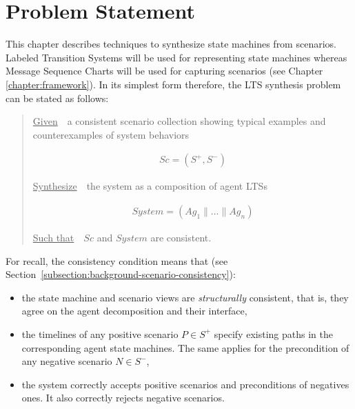 \section{Problem Statement\label{section:inductive-problem-statement}}

This chapter describes techniques to synthesize state machines from scenarios. Labeled Transition Systems will be used for representing state machines whereas Message Sequence Charts will be used for capturing scenarios (see Chapter \ref{chapter:framework}). In its simplest form therefore, the LTS synthesis problem can be stated as follows:

\begin{quotation}
\noindent \underline{Given}~~a consistent scenario collection showing typical examples and counterexamples of system behaviors

\vspace{-0.7cm}
\begin{align*}
Sc = (S^+,S^-)
\end{align*}

\vspace{-0.2cm}
\noindent \underline{Synthesize}~~the system as a composition of agent LTSs

\vspace{-0.7cm}
\begin{align*}
System = (Ag_1 \parallel \ldots \parallel Ag_n)
\end{align*}

\vspace{-0.2cm}
\noindent \underline{Such that}~~$Sc$ and $System$ are consistent.
\end{quotation}

\noindent For recall, the consistency condition means that (see Section~\ref{subsection:background-scenario-consistency}):

\begin{itemize}
\item the state machine and scenario views are \emph{structurally} consistent, that is, they agree on the agent decomposition and their interface,
\item the timelines of any positive scenario $P \in S^+$ specify existing paths in the corresponding agent state machines. The same applies for the precondition of any negative scenario $N \in S^-$,
\item the system correctly accepts positive scenarios and preconditions of negatives ones. It also correctly rejects negative scenarios.
\end{itemize}

